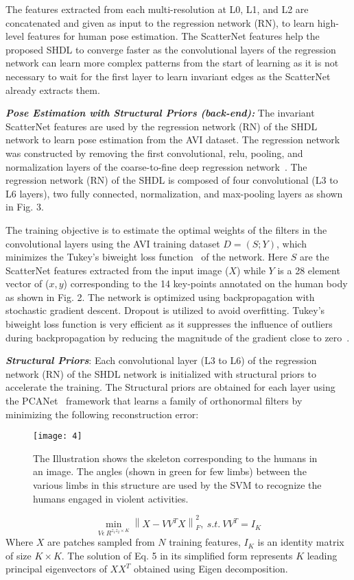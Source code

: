 \documentclass[10pt,twocolumn,letterpaper]{article}
\begin{document}
The features extracted from each multi-resolution at L0, L1, and L2 are concatenated and given as input to the regression network (RN), to learn high-level features for human pose estimation. The ScatterNet features help the proposed SHDL to converge faster as the convolutional layers of the regression network can learn more complex patterns from the start of learning as it is not necessary to wait for the first layer to learn invariant edges as the ScatterNet already extracts them.

\textbf{\textit{Pose Estimation with Structural Priors (back-end):}}
The invariant ScatterNet features are used by the regression network (RN) of the SHDL network to learn pose estimation from the AVI dataset. The regression network was constructed by removing the first convolutional, relu, pooling, and normalization layers of the coarse-to-fine deep regression network~\cite{belagiannis2015robust}. The regression network (RN) of the SHDL is composed of four convolutional (L3 to L6 layers), two fully connected, normalization, and max-pooling layers as shown in Fig. 3. 

The training objective is to estimate the optimal weights of the filters in the convolutional layers using the AVI training dataset $D = (S; Y)$, which minimizes the Tukey's biweight loss function~\cite{belagiannis2015robust} of the network. Here $S$ are the ScatterNet features extracted from the input image ($X$) while $Y$ is a 28  element vector of ($x,y$) corresponding to the 14 key-points annotated on the human body as shown in Fig. 2. The network is optimized using backpropagation with stochastic gradient descent. Dropout is utilized to avoid overfitting. Tukey's biweight loss function is very efficient as it suppresses the influence of outliers during backpropagation by reducing the magnitude of the gradient close to zero~\cite{belagiannis2015robust}. 

\textbf{\textit{Structural Priors}}: Each convolutional layer (L3 to L6) of the regression network (RN) of the SHDL network is initialized with structural priors to accelerate the training. The Structural priors are obtained for each layer using the PCANet~\cite{pcanet} framework that learns a family of orthonormal filters by minimizing the following reconstruction error:
\begin{figure}[t]
	\begin{center}
		\texttt{[image: 4]}
	\end{center}
	\caption{
		The Illustration shows the skeleton corresponding to the humans in an image. The angles (shown in green for few limbs) between the various limbs in this structure are used by the SVM to recognize the humans engaged in violent activities.}
	\label{fig:long}
	\label{fig:onecol}
\end{figure}
\begin{equation}
\min_{V \epsilon \ R^{z_{1}z_{2}\times K} } \left \|X-VV^TX  \right \|_{F}^2,\ s.t.\  VV^T = I_{K}
\end{equation} 
Where $X$ are patches sampled from $N$ training features, $I_K$ is an identity matrix of size $K \times K$. The solution of Eq. 5 in its simplified form represents $K$ leading principal eigenvectors of $XX^T$ obtained using Eigen decomposition.
\end{document}
